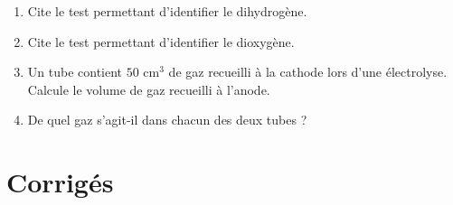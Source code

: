 \begin{enumerate}[label=\arabic*)]
\item Cite le test permettant d'identifier le dihydrogène.
\item Cite le test permettant d'identifier le dioxygène.
\item Un tube contient $50$ cm$^{3}$ de gaz recueilli à la cathode lors d'une électrolyse.
Calcule le volume de gaz recueilli à l'anode.
\item De quel gaz s'agit-il dans chacun des deux tubes ?
\end{enumerate}

\section{Corrigés}
